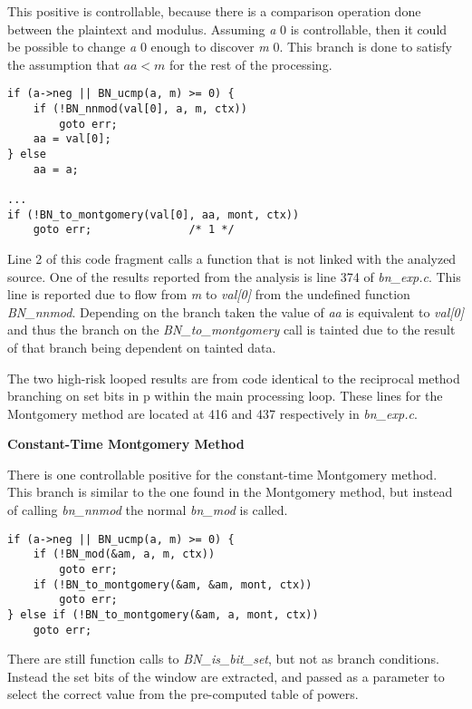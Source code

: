\documentclass[11pt,a4paper]{article}
\newcommand{\codevar}[1]{\textit{#1}}
\newcommand{\codefn}[1]{\textit{#1}}
\newcommand{\codefile}[1]{\textit{#1}}
\newcommand{\ruleabove}{}
\newcommand{\rulebelow}{}
\begin{document}
   This positive is controllable, because there is a comparison operation done
   between the plaintext and modulus. Assuming \codevar{a} 0 is controllable, then it
   could be possible to change \codevar{a} 0 enough to discover \codevar{m} 0. This branch is
   done to satisfy the assumption that $aa < m$ for the rest of the processing.


\ruleabove
\begin{lstlisting}[caption=OpenSSL 1.1.0g - bn\_exp.c lines 363-368]
if (a->neg || BN_ucmp(a, m) >= 0) {
    if (!BN_nnmod(val[0], a, m, ctx))
        goto err;
    aa = val[0];
} else
    aa = a;

... 
if (!BN_to_montgomery(val[0], aa, mont, ctx))
    goto err;               /* 1 */
\end{lstlisting}
\rulebelow

  Line 2 of this code fragment calls a function that is not linked with the
  analyzed source. One of the results reported from the analysis is line 374 of
  \codefile{bn\_exp.c}. This line is reported due to flow from \codevar{m} to \codevar{val[0]} from the
  undefined function \codefn{BN\_nnmod}. Depending on the branch taken the value of \codevar{aa}
  is equivalent to \codevar{val[0]} and thus the branch on the \codefn{BN\_to\_montgomery} call is
  tainted due to the result of that branch being dependent on tainted data.
  
  The two high-risk looped results are from code identical to the reciprocal
  method branching on set bits in p within the main processing loop. These lines
  for the Montgomery method are located at 416 and 437 respectively in \codefile{bn\_exp.c}.

\noindent
\textbf{Constant-Time Montgomery Method}

There is one controllable positive for the constant-time Montgomery method.
This branch is similar to the one found in the Montgomery method, but instead
of calling \codefn{bn\_nnmod} the normal \codefn{bn\_mod} is called. 

\ruleabove
\begin{lstlisting}[caption=OpenSSL 1.1.0g - bn\_exp.c lines 752-758]
if (a->neg || BN_ucmp(a, m) >= 0) {
    if (!BN_mod(&am, a, m, ctx))
        goto err;
    if (!BN_to_montgomery(&am, &am, mont, ctx))
        goto err;
} else if (!BN_to_montgomery(&am, a, mont, ctx))
    goto err;
\end{lstlisting}
\rulebelow

There are still function calls to \codefn{BN\_is\_bit\_set}, but not as branch
conditions. Instead the set bits of the window are extracted, and passed as a
parameter to select the correct value from the pre-computed table of powers.
\end{document}
